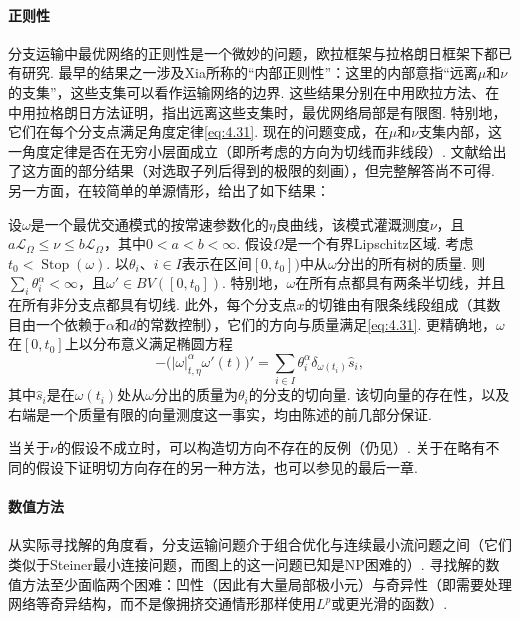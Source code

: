 \paragraph{正则性}
\label{idx:root4-p172-regularity}分支运输中最优网络的正则性是一个微妙的问题，欧拉框架与拉格朗日框架下都已有研究. 最早的结果之一涉及Xia所称的“内部正则性”：这里的内部意指“远离$\mu$和$\nu$的支集”，这些支集可以看作运输网络的边界. 这些结果分别在\cite{b298}中用欧拉方法、在\cite{b49}中用拉格朗日方法证明，指出远离这些支集时，最优网络局部是有限图. 特别地，它们在每个分支点满足角度定律\eqref{eq:4.31}. 现在的问题变成，在$\mu$和$\nu$支集内部，这一角度定律是否在无穷小层面成立（即所考虑的方向为切线而非线段）. 文献\cite{b300}给出了这方面的部分结果（对选取子列后得到的极限的刻画），但完整解答尚不可得. 另一方面，在较简单的单源情形，\cite{b241}给出了如下结果：
\begin{theorem}\label{obj:4.45}
设$\omega$是一个最优交通模式的按常速参数化的$\eta$良曲线，该模式灌溉测度$\nu$，且$a\mathscr L_\Omega\leq\nu\leq b\mathscr L_\Omega$，其中$0<a<b<\infty$. 假设$\Omega$是一个有界Lipschitz区域. 考虑$t_0<\operatorname{Stop}(\omega)$. 以$\theta_i$、$i\in I$表示在区间$[0,t_0])$中从$\omega$分出的所有树的质量. 则$\sum_i\theta_i^\alpha<\infty$，且$\omega'\in BV([0,t_0])$. 特别地，$\omega$在所有点都具有两条半切线，并且在所有非分支点都具有切线. 此外，每个分支点$x$的切锥由有限条线段组成（其数目由一个依赖于$\alpha$和$d$的常数控制），它们的方向与质量满足\eqref{eq:4.31}. 更精确地，$\omega$在$[0,t_0]$上以分布意义满足椭圆方程
\begin{equation}\label{eq:4.34}
 -\bigl(|\omega|_{t,\eta}^\alpha\omega'(t)\bigr)'
       =\sum_{i\in I}\theta_i^\alpha\delta_{\omega(t_i)}\widehat s_i,
\end{equation}
其中$\widehat s_i$是在$\omega(t_i)$处从$\omega$分出的质量为$\theta_i$的分支的切向量. 该切向量的存在性，以及右端是一个质量有限的向量测度这一事实，均由陈述的前几部分保证.
\end{theorem}
当关于$\nu$的假设不成立时，可以构造切方向不存在的反例（仍见\cite{b241}）. 关于在略有不同的假设下证明切方向存在的另一种方法，也可以参见\cite{b271}的最后一章.

\paragraph{数值方法}
\label{idx:root4-p172-steiner}从实际寻找解的角度看，分支运输问题介于组合优化与连续最小流问题之间（它们类似于Steiner最小连接问题，而图上的这一问题已知是NP困难的）. 寻找解的数值方法至少面临两个困难：凹性（因此有大量局部极小元）与奇异性（即需要处理网络等奇异结构，而不是像拥挤交通情形那样使用$L^p$或更光滑的函数）.

